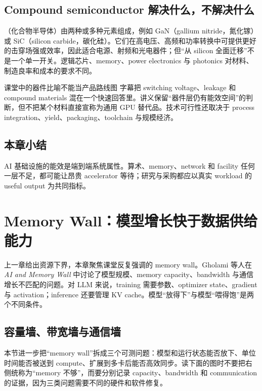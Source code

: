 \documentclass[a4paper]{article}
\begin{document}
\subsection{Compound semiconductor 解决什么，不解决什么}

（化合物半导体）由两种或多种元素组成，例如 GaN（gallium nitride，氮化镓）或 SiC（silicon carbide，碳化硅）。它们在高电压、高频和功率转换中可提供更好的击穿场强或效率，因此适合电源、射频和光电器件；但“从 silicon 全面迁移”不是一个单一开关。逻辑芯片、memory、power electronics 与 photonics 对材料、制造良率和成本的要求不同。

\begin{warningbox}{课堂中的器件比喻不能当产品路线图}
字幕把 switching voltage、leakage 和 compound materials 混在一个快速回答里。讲义保留“器件层仍有能效空间”的判断，但不把某个材料直接宣称为通用 GPU 替代品。技术可行性还取决于 process integration、yield、packaging、toolchain 与规模经济。
\end{warningbox}

\subsection{本章小结}

AI 基础设施的能效是端到端系统属性。算术、memory、network 和 facility 任何一层不足，都可能让昂贵 accelerator 等待；研究与采购都应以真实 workload 的 useful output 为共同指标。

\section{Memory Wall：模型增长快于数据供给能力}

上一章给出资源下界，本章聚焦课堂反复强调的 memory wall。Gholami 等人在 \emph{AI and Memory Wall} 中讨论了模型规模、memory capacity、bandwidth 与通信增长不匹配的问题。对 LLM 来说，training 需要参数、optimizer state、gradient 与 activation；inference 还要管理 KV cache。模型“放得下”与模型“喂得饱”是两个不同条件。

\subsection{容量墙、带宽墙与通信墙}

本节进一步把“memory wall”拆成三个可测问题：模型和运行状态能否放下、单位时间能否被送到 compute、扩展到多卡后能否高效同步。读下面的图时不要把右侧统称为“memory 不够”，而要分别记录 capacity、bandwidth 和 communication 的证据，因为三类问题需要不同的硬件和软件修复。
\end{document}
